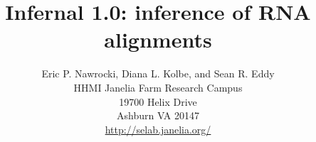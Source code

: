 \title{Infernal 1.0: inference of RNA alignments}
\author{Eric P. Nawrocki, Diana L. Kolbe, and Sean R. Eddy\\
HHMI Janelia Farm Research Campus\\
19700 Helix Drive\\
Ashburn VA 20147\\
\url{http://selab.janelia.org/}\\
}
\maketitle
